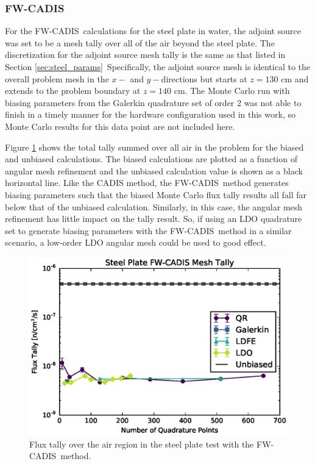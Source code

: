 \documentclass{article} %
\newcommand{\fwc}{\mbox{FW-CADIS}}
\begin{document}
\FloatBarrier
\subsubsection{\fwc}

For the \fwc\ calculations for the steel plate in water, the adjoint source was
set to be a mesh tally over all of the air beyond the steel plate. The
discretization for the adjoint source mesh tally is the same as that listed in 
Section \ref{sec:steel_params}\ Specifically, the adjoint source mesh is
identical to the overall problem mesh in the $x-$ and $y-$directions but starts
at $z = 130$ cm and extends to the problem boundary at $z = 140$ cm.
The Monte Carlo run with biasing parameters from the Galerkin quadrature set
of order 2 was not able to finish in a timely manner for the hardware
configuration used in this work, so Monte Carlo results for this data point
are not included here.

Figure \ref{steel-fwc-tally} shows the total tally summed over all air in the
problem for the biased and unbiased calculations. The biased calculations are
plotted as a function of angular mesh refinement and the unbiased calculation
value is shown as a black horizontal line. Like the CADIS method, the \fwc\
method generates biasing parameters such that the biased Monte Carlo flux
tally results all fall far below that of the unbiased calculation. Similarly,
in this case, the angular mesh refinement has little impact on the tally
result. So, if using an LDO quadrature set to generate biasing parameters with
the \fwc\ method in a similar scenario, a low-order LDO angular mesh could be
used to good effect.

\begin{figure}[!htb]
\centering
\includegraphics[max height=0.445\textheight]{img/steel-fwcadis-tally.eps}
\caption{Flux tally over the air region in the steel plate test with the \fwc\ method.}
\label{steel-fwc-tally}
\end{figure}
\end{document}
